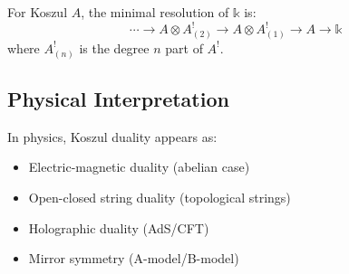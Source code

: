\begin{lemma}
For Koszul $A$, the minimal resolution of $\mathbb{k}$ is:
$$\cdots \to A \otimes A^!_{(2)} \to A \otimes A^!_{(1)} \to A \to \mathbb{k}$$
where $A^!_{(n)}$ is the degree $n$ part of $A^!$.
\end{lemma}

\subsection{Physical Interpretation}

In physics, Koszul duality appears as:
\begin{itemize}
\item Electric-magnetic duality (abelian case)
\item Open-closed string duality (topological strings)  
\item Holographic duality (AdS/CFT)
\item Mirror symmetry (A-model/B-model)
\end{itemize}
